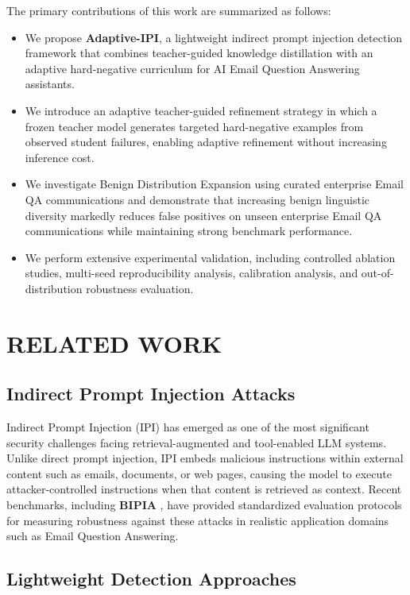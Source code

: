 \documentclass[conference]{IEEEtran}
\begin{document}
The primary contributions of this work are summarized as follows:
\begin{itemize}
    \item We propose \textbf{Adaptive-IPI}, a lightweight indirect prompt injection detection framework that combines teacher-guided knowledge distillation with an adaptive hard-negative curriculum for AI Email Question Answering assistants.
    \item We introduce an adaptive teacher-guided refinement strategy in which a frozen teacher model generates targeted hard-negative examples from observed student failures, enabling adaptive refinement without increasing inference cost.
    \item We investigate Benign Distribution Expansion using curated enterprise Email QA communications and demonstrate that increasing benign linguistic diversity markedly reduces false positives on unseen enterprise Email QA communications while maintaining strong benchmark performance.
    \item We perform extensive experimental validation, including controlled ablation studies, multi-seed reproducibility analysis, calibration analysis, and out-of-distribution robustness evaluation.
\end{itemize}

\section{RELATED WORK}

\subsection{Indirect Prompt Injection Attacks}

Indirect Prompt Injection (IPI) has emerged as one of the most significant security challenges facing retrieval-augmented and tool-enabled LLM systems. Unlike direct prompt injection, IPI embeds malicious instructions within external content such as emails, documents, or web pages, causing the model to execute attacker-controlled instructions when that content is retrieved as context. Recent benchmarks, including \textbf{BIPIA} \cite{ref8}, have provided standardized evaluation protocols for measuring robustness against these attacks in realistic application domains such as Email Question Answering.

\subsection{Lightweight Detection Approaches}
\end{document}
